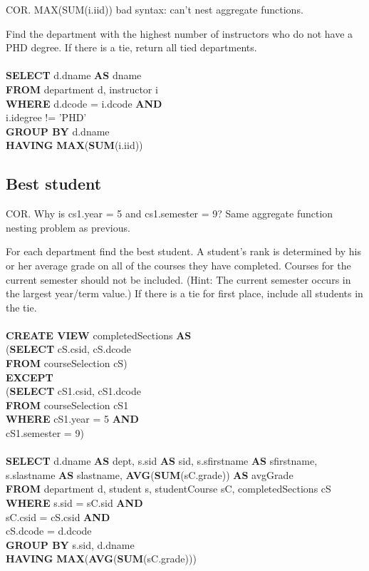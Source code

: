 \documentclass[11pt]{article}
\begin{document}
COR. MAX(SUM(i.iid)) bad syntax: can't nest aggregate functions.

Find the department with the highest number of instructors who do not have a PHD degree.
If there is a tie, return all tied departments.\\
~\\
\textbf{SELECT} d.dname \textbf{AS} dname\\
\textbf{FROM} department d, instructor i\\
\textbf{WHERE} d.dcode = i.dcode \textbf{AND}\\
i.idegree != 'PHD'\\
\textbf{GROUP BY} d.dname\\
\textbf{HAVING} \textbf{MAX}(\textbf{SUM}(i.iid))

\subsection{Best student}

COR. Why is cs1.year = 5 and cs1.semester = 9? Same aggregate function nesting problem as previous.

For each department find the best student. A student’s rank is determined by his or her average grade on all of the courses they have completed. Courses for the current semester should not be included. (Hint: The current semester occurs in the largest year/term value.) If there is a tie for first place, include all students in the tie.\\
~\\
\textbf{CREATE VIEW} completedSections \textbf{AS}\\
(\textbf{SELECT} cS.csid, cS.dcode\\
\textbf{FROM} courseSelection cS)\\
\textbf{EXCEPT}\\
(\textbf{SELECT} cS1.csid, cS1.dcode\\
\textbf{FROM} courseSelection cS1\\
\textbf{WHERE} cS1.year = 5 \textbf{AND}\\
cS1.semester = 9)\\
~\\
\textbf{SELECT} d.dname \textbf{AS} dept, s.sid \textbf{AS} sid, s.sfirstname \textbf{AS} sfirstname,\\ s.slastname \textbf{AS} slastname, \textbf{AVG}(\textbf{SUM}(sC.grade)) \textbf{AS} avgGrade \\
\textbf{FROM} department d, student s, studentCourse sC, completedSections cS\\
\textbf{WHERE} s.sid = sC.sid \textbf{AND}\\
sC.csid = cS.csid \textbf{AND}\\
cS.dcode = d.dcode\\
\textbf{GROUP BY} s.sid, d.dname\\
\textbf{HAVING} \textbf{MAX}(\textbf{AVG}(\textbf{SUM}(sC.grade)))\\
\end{document}
